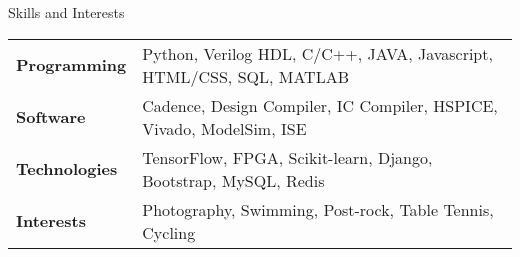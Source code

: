 \documentclass{resume_Stanford} %
\begin{document}
\begin{rSection}{Skills and Interests}
\begin{tabular}{ll}
\textbf{Programming \qquad} & Python, Verilog HDL, C/C++, JAVA, Javascript, HTML/CSS, SQL, MATLAB\\
\textbf{Software} & Cadence, Design Compiler, IC Compiler, HSPICE, Vivado, ModelSim, ISE\\
\textbf{Technologies} & TensorFlow, FPGA, Scikit-learn, Django, Bootstrap, MySQL, Redis\\
\textbf{Interests} & Photography, Swimming, Post-rock, Table Tennis, Cycling\\
\end{tabular}
\end{rSection}
\end{document}

